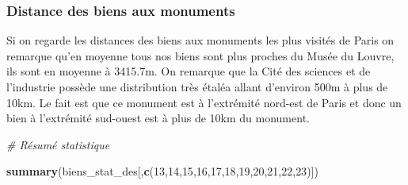 \documentclass[french,]{article}
\newenvironment{Shaded}{\begin{snugshade}}{\end{snugshade}}
\newcommand{\CommentTok}[1]{\textcolor[rgb]{0.56,0.35,0.01}{\textit{#1}}}
\newcommand{\DecValTok}[1]{\textcolor[rgb]{0.00,0.00,0.81}{#1}}
\newcommand{\KeywordTok}[1]{\textcolor[rgb]{0.13,0.29,0.53}{\textbf{#1}}}
\newcommand{\NormalTok}[1]{#1}
\begin{document}
\hypertarget{distance-des-biens-aux-monuments}{%
\subsubsection{Distance des biens aux
monuments}\label{distance-des-biens-aux-monuments}}

Si on regarde les distances des biens aux monuments les plus visités de
Paris on remarque qu'en moyenne tous nos biens sont plus proches du
Musée du Louvre, ils sont en moyenne à 3415.7m. On remarque que la Cité
des sciences et de l'industrie possède une distribution très étaléa
allant d'environ 500m à plus de 10km. Le fait est que ce monument est à
l'extrémité nord-est de Paris et donc un bien à l'extrémité sud-ouest
est à plus de 10km du monument.

\begin{Shaded}
\begin{Highlighting}[]
\CommentTok{# Résumé statistique}

\KeywordTok{summary}\NormalTok{(biens_stat_des[,}\KeywordTok{c}\NormalTok{(}\DecValTok{13}\NormalTok{,}\DecValTok{14}\NormalTok{,}\DecValTok{15}\NormalTok{,}\DecValTok{16}\NormalTok{,}\DecValTok{17}\NormalTok{,}\DecValTok{18}\NormalTok{,}\DecValTok{19}\NormalTok{,}\DecValTok{20}\NormalTok{,}\DecValTok{21}\NormalTok{,}\DecValTok{22}\NormalTok{,}\DecValTok{23}\NormalTok{)])}
\end{Highlighting}
\end{Shaded}
\end{document}
